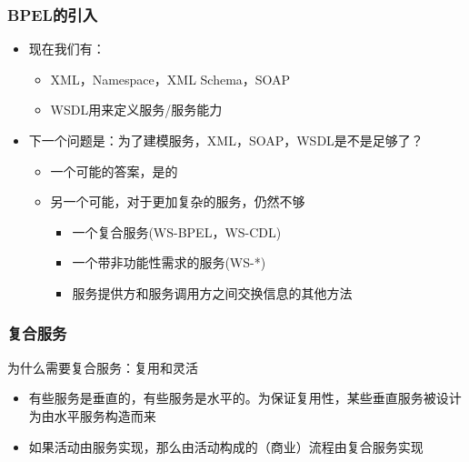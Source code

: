 \subsubsection{BPEL的引入}
\begin{itemize}
    \item 现在我们有：
    \vspace{-0.8em}
    \begin{multicols}{2}
        \begin{itemize}
            \item XML，Namespace，XML Schema，SOAP
            \item WSDL用来定义服务/服务能力
        \end{itemize}
    \end{multicols}
    \vspace{-1em}
    \item 下一个问题是：为了建模服务，XML，SOAP，WSDL是不是足够了？
    \begin{itemize}
        \item 一个可能的答案，是的
        \item 另一个可能，对于更加复杂的服务，仍然不够
        \vspace{-1.2em}
        \begin{multicols}{2}
            \begin{itemize}
                \item 一个复合服务(WS-BPEL，WS-CDL)
                \item 一个带非功能性需求的服务(WS-*)
                \item 服务提供方和服务调用方之间交换信息的其他方法
            \end{itemize}
        \end{multicols}
        \vspace{-1em}
    \end{itemize}
\end{itemize}

\subsubsection{复合服务}
为什么需要复合服务：复用和灵活
\begin{itemize}
    \item 有些服务是垂直的，有些服务是水平的。为保证复用性，某些垂直服务被设计为由水平服务构造而来
    \item 如果活动由服务实现，那么由活动构成的（商业）流程由复合服务实现
\end{itemize}

